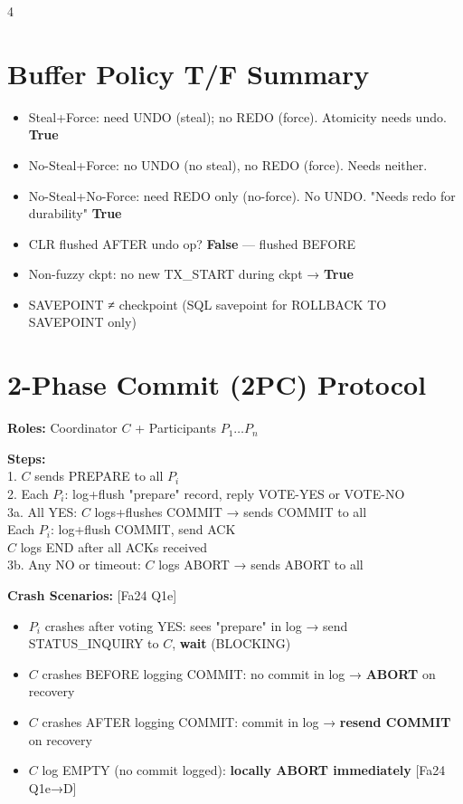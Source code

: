 \documentclass[8pt,letterpaper]{article}
\newcommand{\key}[1]{\textbf{\color{red!70!black}#1}}
\newcommand{\ans}[1]{\textbf{\color{blue!80!black}#1}}
\newcommand{\qref}[1]{{\fontsize{3.5}{4}\selectfont\color{purple!60!black}[#1]}}
\begin{document}
\begin{multicols*}{4}
\section{Buffer Policy T/F Summary}
\begin{itemize}
  \item Steal+Force: need UNDO (steal); no REDO (force). Atomicity needs undo. \ans{True}
  \item No-Steal+Force: no UNDO (no steal), no REDO (force). Needs neither.
  \item No-Steal+No-Force: need REDO only (no-force). No UNDO. "Needs redo for durability" \ans{True}
  \item CLR flushed AFTER undo op? \ans{False} — flushed BEFORE
  \item Non-fuzzy ckpt: no new TX\_START during ckpt → \ans{True}
  \item SAVEPOINT ≠ checkpoint (SQL savepoint for ROLLBACK TO SAVEPOINT only)
\end{itemize}

\section{2-Phase Commit (2PC) Protocol}
\key{Roles:} Coordinator $C$ + Participants $P_1\ldots P_n$

\begin{greenbox}
\textbf{Steps:}\\
1. $C$ sends PREPARE to all $P_i$\\
2. Each $P_i$: log+flush "prepare" record, reply VOTE-YES or VOTE-NO\\
3a. All YES: $C$ logs+flushes COMMIT → sends COMMIT to all\\
   Each $P_i$: log+flush COMMIT, send ACK\\
   $C$ logs END after all ACKs received\\
3b. Any NO or timeout: $C$ logs ABORT → sends ABORT to all
\end{greenbox}

\key{Crash Scenarios:} \qref{Fa24 Q1e}
\begin{itemize}
  \item $P_i$ crashes after voting YES: sees "prepare" in log → send STATUS\_INQUIRY to $C$, \textbf{wait} (BLOCKING)
  \item $C$ crashes BEFORE logging COMMIT: no commit in log → \textbf{ABORT} on recovery
  \item $C$ crashes AFTER logging COMMIT: commit in log → \textbf{resend COMMIT} on recovery
  \item $C$ log EMPTY (no commit logged): \textbf{locally ABORT immediately} \qref{Fa24 Q1e→D}
\end{itemize}


\end{multicols*}
\end{document}

